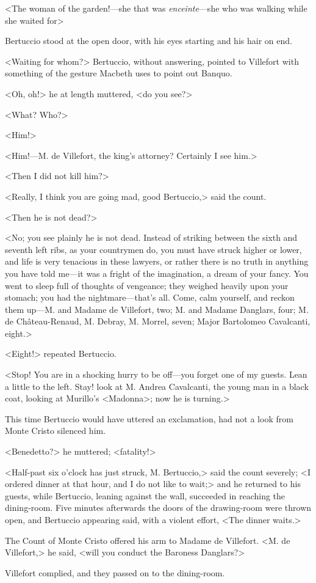  <The woman of the garden!—she that was \textit{enceinte}—she who was walking while she waited for\longdash> 

 Bertuccio stood at the open door, with his eyes starting and his hair on end. 

 <Waiting for whom?> Bertuccio, without answering, pointed to Villefort with something of the gesture Macbeth uses to point out Banquo. 

 <Oh, oh!> he at length muttered, <do you see?> 

 <What? Who?> 

 <Him!> 

 <Him!—M. de Villefort, the king's attorney? Certainly I see him.> 

 <Then I did not kill him?> 

 <Really, I think you are going mad, good Bertuccio,> said the count. 

 <Then he is not dead?>

<No; you see plainly he is not dead. Instead of striking between the sixth and seventh left ribs, as your countrymen do, you must have struck higher or lower, and life is very tenacious in these lawyers, or rather there is no truth in anything you have told me—it was a fright of the imagination, a dream of your fancy. You went to sleep full of thoughts of vengeance; they weighed heavily upon your stomach; you had the nightmare—that's all. Come, calm yourself, and reckon them up—M. and Madame de Villefort, two; M. and Madame Danglars, four; M. de Château-Renaud, M. Debray, M. Morrel, seven; Major Bartolomeo Cavalcanti, eight.> 

 <Eight!> repeated Bertuccio. 

 <Stop! You are in a shocking hurry to be off—you forget one of my guests. Lean a little to the left. Stay! look at M. Andrea Cavalcanti, the young man in a black coat, looking at Murillo's <Madonna>; now he is turning.> 

 This time Bertuccio would have uttered an exclamation, had not a look from Monte Cristo silenced him. 

 <Benedetto?> he muttered; <fatality!> 

 <Half-past six o'clock has just struck, M. Bertuccio,> said the count severely; <I ordered dinner at that hour, and I do not like to wait;> and he returned to his guests, while Bertuccio, leaning against the wall, succeeded in reaching the dining-room. Five minutes afterwards the doors of the drawing-room were thrown open, and Bertuccio appearing said, with a violent effort, <The dinner waits.> 

 The Count of Monte Cristo offered his arm to Madame de Villefort. <M. de Villefort,> he said, <will you conduct the Baroness Danglars?> 

 Villefort complied, and they passed on to the dining-room. 